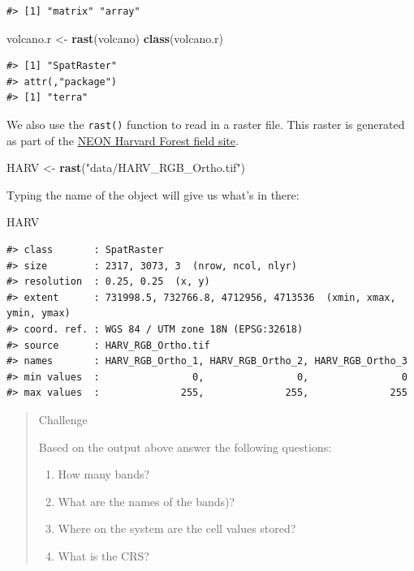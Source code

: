\documentclass[
]{book}
\newenvironment{Shaded}{\begin{snugshade}}{\end{snugshade}}
\newcommand{\FunctionTok}[1]{\textcolor[rgb]{0.13,0.29,0.53}{\textbf{#1}}}
\newcommand{\NormalTok}[1]{#1}
\newcommand{\OtherTok}[1]{\textcolor[rgb]{0.56,0.35,0.01}{#1}}
\newcommand{\StringTok}[1]{\textcolor[rgb]{0.31,0.60,0.02}{#1}}
\providecommand{\tightlist}{%
  \setlength{\itemsep}{0pt}\setlength{\parskip}{0pt}}
\begin{document}
\begin{verbatim}
#> [1] "matrix" "array"
\end{verbatim}

\begin{Shaded}
\begin{Highlighting}[]
\NormalTok{volcano.r }\OtherTok{\textless{}{-}} \FunctionTok{rast}\NormalTok{(volcano)}
\FunctionTok{class}\NormalTok{(volcano.r)}
\end{Highlighting}
\end{Shaded}

\begin{verbatim}
#> [1] "SpatRaster"
#> attr(,"package")
#> [1] "terra"
\end{verbatim}

We also use the \texttt{rast()} function to read in a raster file. This raster is generated as part of the \href{https://www.neonscience.org/field-sites/field-sites-map/HARV}{NEON Harvard Forest field site}.

\begin{Shaded}
\begin{Highlighting}[]
\NormalTok{HARV }\OtherTok{\textless{}{-}} \FunctionTok{rast}\NormalTok{(}\StringTok{"data/HARV\_RGB\_Ortho.tif"}\NormalTok{)}
\end{Highlighting}
\end{Shaded}

Typing the name of the object will give us what's in there:

\begin{Shaded}
\begin{Highlighting}[]
\NormalTok{HARV}
\end{Highlighting}
\end{Shaded}

\begin{verbatim}
#> class       : SpatRaster 
#> size        : 2317, 3073, 3  (nrow, ncol, nlyr)
#> resolution  : 0.25, 0.25  (x, y)
#> extent      : 731998.5, 732766.8, 4712956, 4713536  (xmin, xmax, ymin, ymax)
#> coord. ref. : WGS 84 / UTM zone 18N (EPSG:32618) 
#> source      : HARV_RGB_Ortho.tif 
#> names       : HARV_RGB_Ortho_1, HARV_RGB_Ortho_2, HARV_RGB_Ortho_3 
#> min values  :                0,                0,                0 
#> max values  :              255,              255,              255
\end{verbatim}

\begin{quote}
Challenge

Based on the output above answer the following questions:

\begin{enumerate}
\def\labelenumi{\arabic{enumi}.}
\tightlist
\item
  How many bands?
\item
  What are the names of the bands)?
\item
  Where on the system are the cell values stored?
\item
  What is the CRS?
\end{enumerate}
\end{quote}
\end{document}
